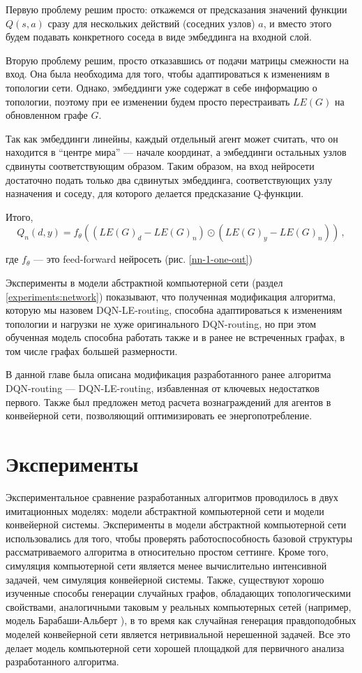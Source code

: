 \documentclass[specification,annotation,times]{itmo-student-thesis}
\theoremstyle{definition}
\begin{document}
Первую проблему решим просто: откажемся от предсказания значений функции
$Q(s, a)$ сразу для нескольких действий (соседних узлов) $a$, и вместо этого
будем подавать конкретного соседа в виде эмбеддинга на входной слой.

Вторую проблему решим, просто отказавшись от подачи матрицы смежности на вход.
Она была необходима для того, чтобы адаптироваться к изменениям в топологии
сети. Однако, эмбеддинги уже содержат в себе информацию о топологии, поэтому при
ее изменении будем просто перестраивать $LE(G)$ на обновленном графе $G$.

Так как эмбеддинги линейны, каждый отдельный агент может считать, что он
находится в ``центре мира'' --- начале координат, а эмбеддинги остальных узлов
сдвинуты соответствующим образом. Таким образом, на вход нейросети достаточно
подать только два сдвинутых эмбеддинга, соответствующих узлу назначения и
соседу, для которого делается предсказание Q-функции.

Итого,
\begin{equation}
  Q_n(d, y) = f_{\theta}( (LE(G)_d - LE(G)_n) \odot (LE(G)_y - LE(G)_n)) \,,
\end{equation}

где $f_{\theta}$ --- это feed-forward нейросеть (рис. \ref{nn-1-one-out})

Эксперименты в модели абстрактной компьютерной сети (раздел
\ref{experiments:network}) показывают, что полученная модификация алгоритма,
которую мы назовем DQN-LE-routing, способна адаптироваться к изменениям
топологии и нагрузки не хуже оригинального DQN-routing, но при этом обученная
модель способна работать также и в ранее не встреченных графах, в том числе
графах большей размерности.

\chapterconclusion

В данной главе была описана модификация разработанного ранее алгоритма
DQN-routing --- DQN-LE-routing, избавленная от ключевых недостатков первого.
Также был предложен метод расчета вознаграждений для агентов в конвейерной сети,
позволяющий оптимизировать ее энергопотребление.

\chapter{Эксперименты}\label{experiments}

Экспериментальное сравнение разработанных алгоритмов проводилось в двух
имитационных моделях: модели абстрактной компьютерной сети и модели конвейерной
системы. Эксперименты в модели абстрактной компьютерной сети использовались для
того, чтобы проверять работоспособность базовой структуры рассматриваемого
алгоритма в относительно простом сеттинге. Кроме того, симуляция компьютерной
сети является менее вычислительно интенсивной задачей, чем симуляция конвейерной
системы. Также, существуют хорошо изученные способы генерации случайных графов,
обладающих топологическими свойствами, аналогичными таковым у реальных
компьютерных сетей (например, модель Барабаши-Альберт
\cite{albert2002statistical}), в то время как случайная генерация правдоподобных
моделей конвейерной сети является нетривиальной нерешенной задачей. Все это
делает модель компьютерной сети хорошей площадкой для первичного анализа
разработанного алгоритма.
\end{document}
